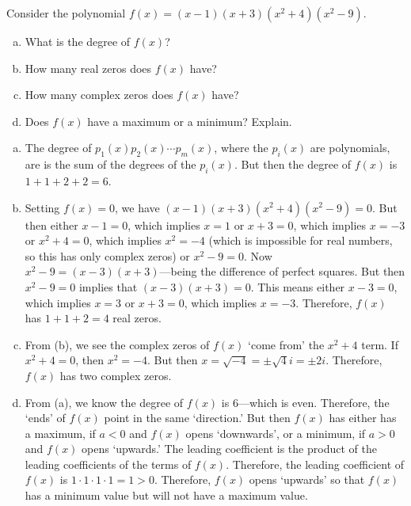 \documentclass[11pt,letterpaper]{article}
\begin{document}

 Consider the polynomial $f(x)= (x - 1)(x + 3)(x^2 + 4)(x^2 - 9)$. 
	\begin{enumerate}[(a)]
	\item What is the degree of $f(x)$?
	\item How many real zeros does $f(x)$ have?
	\item How many complex zeros does $f(x)$ have?
	\item Does $f(x)$ have a maximum or a minimum? Explain. 
	\end{enumerate} \pspace

\sol
\begin{enumerate}[(a)]
\item The degree of $p_1(x) p_2(x) \cdots p_m(x)$, where the $p_i(x)$ are polynomials, are is the sum of the degrees of the $p_i(x)$. But then the degree of $f(x)$ is $1 + 1 + 2 + 2= 6$. \pspace

\item Setting $f(x)= 0$, we have $(x - 1)(x + 3)(x^2 + 4)(x^2 - 9)= 0$. But then either $x - 1= 0$, which implies $x= 1$ or $x + 3= 0$, which implies $x= -3$ or $x^2 + 4= 0$, which implies $x^2= -4$ (which is impossible for real numbers, so this has only complex zeros) or $x^2 - 9= 0$. Now $x^2 - 9= (x - 3)(x + 3)$---being the difference of perfect squares. But then $x^2 - 9= 0$ implies that $(x - 3)(x + 3)= 0$. This means either $x - 3= 0$, which implies $x= 3$ or $x + 3= 0$, which implies $x= -3$. Therefore, $f(x)$ has $1 + 1 + 2= 4$ real zeros. \pspace

\item From (b), we see the complex zeros of $f(x)$ `come from' the $x^2 + 4$ term. If $x^2 + 4= 0$, then $x^2= -4$. But then $x= \sqrt{-4}= \pm \sqrt{4} i= \pm 2i$. Therefore, $f(x)$ has two complex zeros. \pspace

\item From (a), we know the degree of $f(x)$ is 6---which is even. Therefore, the `ends' of $f(x)$ point in the same `direction.' But then $f(x)$ has either has a maximum, if $a < 0$ and $f(x)$ opens `downwards', or a minimum, if $a > 0$ and $f(x)$ opens `upwards.' The leading coefficient is the product of the leading coefficients of the terms of $f(x)$. Therefore, the leading coefficient of $f(x)$ is $1 \cdot 1 \cdot 1 \cdot 1= 1 > 0$. Therefore, $f(x)$ opens `upwards' so that $f(x)$ has a minimum value but will not have a maximum value. 
\end{enumerate}
\end{document}
